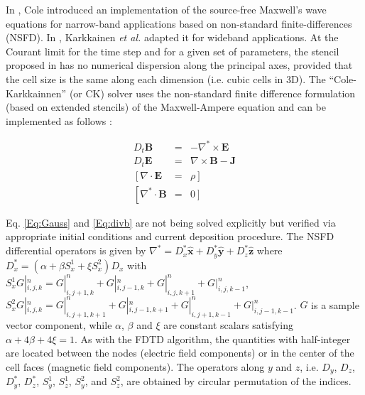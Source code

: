 

In \cite{ColeIEEE1997,ColeIEEE2002}, Cole introduced an implementation
of the source-free Maxwell's wave equations for narrow-band applications
based on non-standard finite-differences (NSFD). In \cite{KarkICAP06},
Karkkainen \emph{et al.} adapted it for wideband applications. At
the Courant limit for the time step and for a given set of parameters,
the stencil proposed in \cite{KarkICAP06} has no numerical dispersion
along the principal axes, provided that the cell size is the same
along each dimension (i.e. cubic cells in 3D). The ``Cole-Karkkainnen''
(or CK) solver uses the non-standard finite difference formulation
(based on extended stencils) of the Maxwell-Ampere equation and can be 
implemented as follows \cite{VayJCP2011}:

\begin{subequations}
\begin{eqnarray}
D_{t}\mathbf{B} & = & -\nabla^{*}\times\mathbf{E}\label{Eq:Faraday}\\
D_{t}\mathbf{E} & = & \nabla\times\mathbf{B}-\mathbf{J}\label{Eq:Ampere}\\
\left[\nabla\cdot\mathbf{E}\right. & = & \left.\rho\right]\label{Eq:Gauss}\\
\left[\nabla^{*}\cdot\mathbf{B}\right. & = & \left.0\right]\label{Eq:divb}
\end{eqnarray}
\end{subequations}

Eq. \ref{Eq:Gauss} and \ref{Eq:divb} are not being solved explicitly
but verified via appropriate initial conditions and current deposition
procedure. The NSFD differential operators is given by $\nabla^{*}=D_{x}^{*}\mathbf{\hat{x}}+D_{y}^{*}\mathbf{\hat{y}}+D_{z}^{*}\mathbf{\hat{z}}$
where $D_{x}^{*}=\left(\alpha+\beta S_{x}^{1}+\xi S_{x}^{2}\right)D_{x}$
with $S_{x}^{1}G|_{i,j,k}^{n}=G|_{i,j+1,k}^{n}+G|_{i,j-1,k}^{n}+G|_{i,j,k+1}^{n}+G|_{i,j,k-1}^{n}$,
$S_{x}^{2}G|_{i,j,k}^{n}=G|_{i,j+1,k+1}^{n}+G|_{i,j-1,k+1}^{n}+G|_{i,j+1,k-1}^{n}+G|_{i,j-1,k-1}^{n}$.
$G$ is a sample vector component, while $\alpha$, $\beta$ and $\xi$
are constant scalars satisfying $\alpha+4\beta+4\xi=1$. As with
the FDTD algorithm, the quantities with half-integer are located between
the nodes (electric field components) or in the center of the cell
faces (magnetic field components). The operators along $y$ and $z$,
i.e. $D_{y}$, $D_{z}$, $D_{y}^{*}$, $D_{z}^{*}$, $S_{y}^{1}$,
$S_{z}^{1}$, $S_{y}^{2}$, and $S_{z}^{2}$, are obtained by circular
permutation of the indices.

